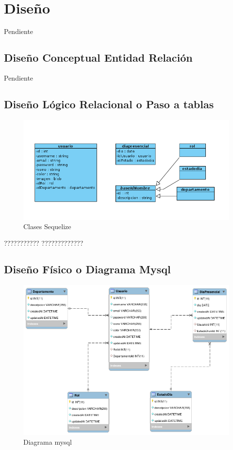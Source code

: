 \documentclass[11pt,spanish,listoffigures,listoftables]{tfgetsinf}
\begin{document}
\chapter{Diseño}

Pendiente

\section{Diseño Conceptual Entidad Relación}

Pendiente

\section{Diseño Lógico Relacional o Paso a tablas}

\begin{figure}[h!] %
   \includegraphics[width=\linewidth]{img/Clases sequelize.png}
   \caption{Clases Sequelize}
   \label{fig:clasesSequelize}
 \end{figure}??????????? ?????????????

\section{Diseño Físico o Diagrama Mysql}

\begin{figure}[h!] %
   \includegraphics[width=\linewidth]{img/EsquemaBBDD.png}
   \caption{Diagrama mysql}
   \label{fig:diagramaMysql}
 \end{figure}
\end{document}
